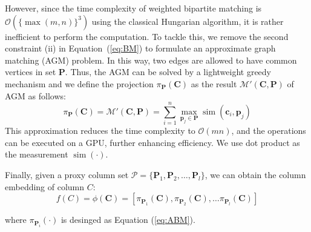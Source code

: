 However, since the time complexity of weighted bipartite matching is 
$\mathcal{O}(\{\max(m,n)\}^3)$ using the classical Hungarian algorithm, it is rather inefficient to perform the computation.
To tackle this,
we remove the second constraint (ii) in Equation~(\ref{eq:BM}) to formulate an approximate graph matching (AGM) problem. In this way, two edges are allowed to have common vertices in set $\mathbf{P}$. Thus, the AGM can be solved by a lightweight greedy mechanism and we define the projection $\pi_{\mathbf{P}}(\mathbf{C})$ as the result  $\mathcal{M}'(\mathbf{C}, \mathbf{P})$ of AGM as follows:
\begin{equation}
\label{eq:ABM}
     \pi_{\mathbf{P}}(\mathbf{C}) = \mathcal{M}'(\mathbf{C}, \mathbf{P})=\sum_{i=1}^n  \max _{\mathbf{p}_j\in \mathbf{P}} \operatorname{sim}\left(\mathbf{c}_{i},\mathbf{p}_{j}\right)
\end{equation}
\noindent This approximation reduces the time complexity to $\mathcal{O}(mn)$, and the operations can be executed on a GPU, further enhancing efficiency. We use dot product as the measurement $\operatorname{sim}(\cdot)$.



Finally, given a proxy column set $\mathcal{P} = \{\mathbf{P}_1, \mathbf{P}_2, \dots, \mathbf{P}_l \}$, we can obtain the column embedding of column $C$:
\begin{equation}
\label{eq:pi}
    f(C)  =  \phi(\mathbf{C}) = \left[\pi_{\mathbf{P}_1} (\mathbf{C}), \pi_{\mathbf{P}_2}(\mathbf{C}), \ldots \pi_{\mathbf{P}_l} (\mathbf{C})\right] 
\end{equation}

\noindent where $\pi_{\mathbf{P}_i}(\cdot)$ is desinged as Equation (\ref{eq:ABM}).



